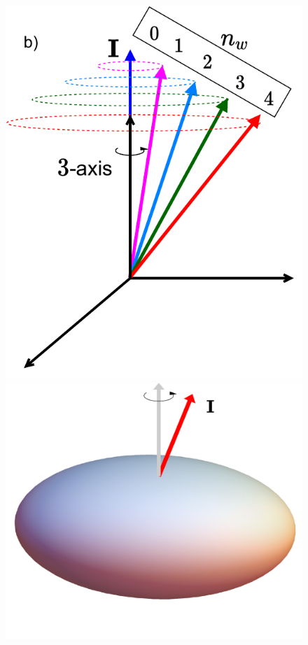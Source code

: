 \documentclass{beamer}
\begin{document}
\begin{frame}
\begin{figure}
    \includegraphics[scale=0.32]{Figs/wobbling_n_schematic-2.pdf}
    \includegraphics[scale=0.18]{Figs/triaxial-shapes-rotor-core.pdf}
  \end{figure}
\end{frame}
\end{document}

